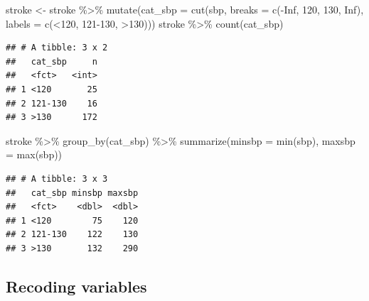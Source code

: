 \documentclass[
  10pt,
]{krantz}
\newenvironment{Shaded}{\begin{snugshade}}{\end{snugshade}}
\newcommand{\AttributeTok}[1]{\textcolor[rgb]{0.77,0.63,0.00}{#1}}
\newcommand{\ConstantTok}[1]{\textcolor[rgb]{0.00,0.00,0.00}{#1}}
\newcommand{\DecValTok}[1]{\textcolor[rgb]{0.00,0.00,0.81}{#1}}
\newcommand{\FunctionTok}[1]{\textcolor[rgb]{0.00,0.00,0.00}{#1}}
\newcommand{\NormalTok}[1]{#1}
\newcommand{\OtherTok}[1]{\textcolor[rgb]{0.56,0.35,0.01}{#1}}
\newcommand{\SpecialCharTok}[1]{\textcolor[rgb]{0.00,0.00,0.00}{#1}}
\newcommand{\StringTok}[1]{\textcolor[rgb]{0.31,0.60,0.02}{#1}}
\begin{document}
\begin{Shaded}
\begin{Highlighting}[]
\NormalTok{stroke }\OtherTok{\textless{}{-}}\NormalTok{ stroke }\SpecialCharTok{\%\textgreater{}\%} 
  \FunctionTok{mutate}\NormalTok{(}\AttributeTok{cat\_sbp =} \FunctionTok{cut}\NormalTok{(sbp, }\AttributeTok{breaks =} \FunctionTok{c}\NormalTok{(}\SpecialCharTok{{-}}\ConstantTok{Inf}\NormalTok{, }\DecValTok{120}\NormalTok{, }\DecValTok{130}\NormalTok{, }\ConstantTok{Inf}\NormalTok{),}
                       \AttributeTok{labels =} \FunctionTok{c}\NormalTok{(}\StringTok{\textquotesingle{}\textless{}120\textquotesingle{}}\NormalTok{, }\StringTok{\textquotesingle{}121{-}130\textquotesingle{}}\NormalTok{, }\StringTok{\textquotesingle{}\textgreater{}130\textquotesingle{}}\NormalTok{)))}
\NormalTok{stroke }\SpecialCharTok{\%\textgreater{}\%} \FunctionTok{count}\NormalTok{(cat\_sbp)}
\end{Highlighting}
\end{Shaded}

\begin{verbatim}
## # A tibble: 3 x 2
##   cat_sbp     n
##   <fct>   <int>
## 1 <120       25
## 2 121-130    16
## 3 >130      172
\end{verbatim}

\begin{Shaded}
\begin{Highlighting}[]
\NormalTok{stroke }\SpecialCharTok{\%\textgreater{}\%} \FunctionTok{group\_by}\NormalTok{(cat\_sbp) }\SpecialCharTok{\%\textgreater{}\%} \FunctionTok{summarize}\NormalTok{(}\AttributeTok{minsbp =} \FunctionTok{min}\NormalTok{(sbp),}
                                           \AttributeTok{maxsbp =} \FunctionTok{max}\NormalTok{(sbp))}
\end{Highlighting}
\end{Shaded}

\begin{verbatim}
## # A tibble: 3 x 3
##   cat_sbp minsbp maxsbp
##   <fct>    <dbl>  <dbl>
## 1 <120        75    120
## 2 121-130    122    130
## 3 >130       132    290
\end{verbatim}

\hypertarget{recoding-variables}{%
\subsection{\texorpdfstring{Recoding variables}{Recoding variables}}\label{recoding-variables}}
\end{document}
